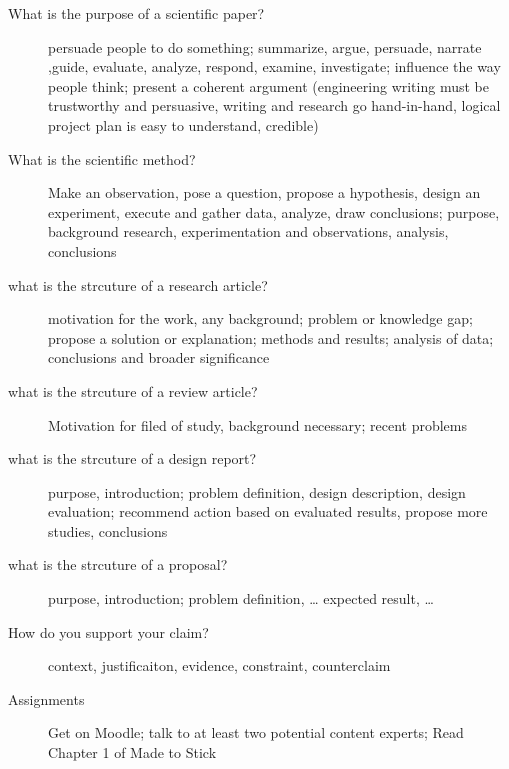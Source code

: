 \documentclass[10pt]{article}
\begin{document}
\begin{description}
\item[What is the purpose of a scientific paper?]
  persuade people to do something;
  summarize, argue, persuade, narrate ,guide, evaluate, analyze, respond, examine, investigate;
  influence the way people think;
  present a coherent argument (engineering writing must be trustworthy and persuasive, writing and research go hand-in-hand, logical project plan is easy to understand, credible)
\item[What is the scientific method?]
  Make an observation, pose a question, propose a hypothesis, design an experiment, execute and gather data, analyze, draw conclusions;
  purpose, background research, experimentation and observations, analysis, conclusions
\item[what is the strcuture of a research article?]
  motivation for the work, any background;
  problem or knowledge gap;
  propose a solution or explanation;
  methods and results;
  analysis of data;
  conclusions and broader significance
\item[what is the strcuture of a review article?]
  Motivation for filed of study, background necessary;
  recent problems
\item[what is the strcuture of a design report?]
  purpose, introduction;
  problem definition, design description, design evaluation;
  recommend action based on evaluated results, propose more studies, conclusions
\item[what is the strcuture of a proposal?]
  purpose, introduction;
  problem definition, \dots
  expected result, \dots
\item[How do you support your claim?]
  context, justificaiton, evidence, constraint, counterclaim
\item[Assignments]
  Get on Moodle;
  talk to at least two potential content experts;
  Read Chapter 1 of Made to Stick
\end{description}
\end{document}
